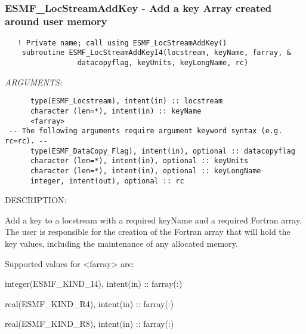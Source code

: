\mbox{}\hrulefill\ 
 
\subsubsection [ESMF\_LocStreamAddKey] {ESMF\_LocStreamAddKey - Add a key Array created around user memory }


 
\begin{verbatim}   ! Private name; call using ESMF_LocStreamAddKey()
    subroutine ESMF_LocStreamAddKeyI4(locstream, keyName, farray, &
                 datacopyflag, keyUnits, keyLongName, rc)\end{verbatim}{\em ARGUMENTS:}
\begin{verbatim}      type(ESMF_Locstream), intent(in) :: locstream
      character (len=*), intent(in) :: keyName
      <farray>
 -- The following arguments require argument keyword syntax (e.g. rc=rc). --
      type(ESMF_DataCopy_Flag), intent(in), optional :: datacopyflag
      character (len=*), intent(in), optional :: keyUnits
      character (len=*), intent(in), optional :: keyLongName
      integer, intent(out), optional :: rc\end{verbatim}
{\sf DESCRIPTION:\\ }


      Add a key to a locstream with a required keyName and a required 
      Fortran array.  The user is responsible for the creation of the 
      Fortran array that will hold the key values, including 
      the maintenance of any allocated memory.
  
      Supported values for <farray> are:
      \begin{description}
      \item integer(ESMF\_KIND\_I4), intent(in) :: farray(:)
      \item real(ESMF\_KIND\_R4),    intent(in) :: farray(:)
      \item real(ESMF\_KIND\_R8),    intent(in) :: farray(:)
      \end{description}
  
